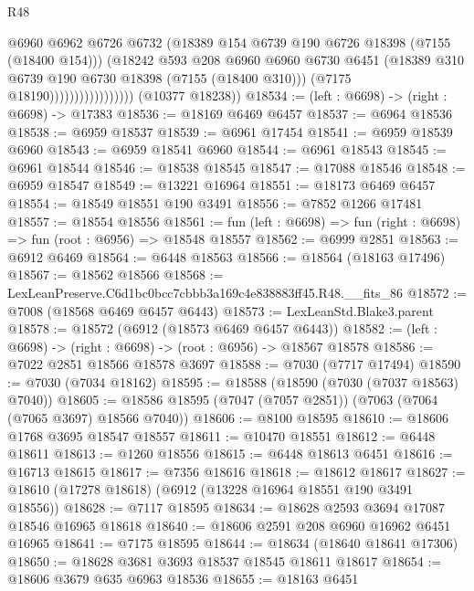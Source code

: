\begin{lexlean}{R48}
\begin{coremodule}
                                    @6960
                                    @6962
                                    @6726
                                    @6732
                                    (@18389 @154 @6739 @190 @6726 @18398 (@7155 (@18400 @154)))
                                    (@18242
                                      @593
                                      @208
                                      @6960
                                      @6960
                                      @6730
                                      @6451
                                      (@18389 @310 @6739 @190 @6730 @18398 (@7155 (@18400 @310)))
                                      (@7175 @18190)))))))))))))))))
      (@10377 @18238))
@18534 := (left : @6698) -> (right : @6698) -> @17383
@18536 := @18169 @6469 @6457
@18537 := @6964 @18536
@18538 := @6959 @18537
@18539 := @6961 @17454
@18541 := @6959 @18539 @6960
@18543 := @6959 @18541 @6960
@18544 := @6961 @18543
@18545 := @6961 @18544
@18546 := @18538 @18545
@18547 := @17088 @18546
@18548 := @6959 @18547
@18549 := @13221 @16964
@18551 := @18173 @6469 @6457
@18554 := @18549 @18551 @190 @3491
@18556 := @7852 @1266 @17481
@18557 := @18554 @18556
@18561 := fun (left : @6698) => fun (right : @6698) => fun (root : @6956) => @18548 @18557
@18562 := @6999 @2851
@18563 := @6912 @6469
@18564 := @6448 @18563
@18566 := @18564 (@18163 @17496)
@18567 := @18562 @18566
@18568 := LexLeanPreserve.C6d1bc0bcc7cbbb3a169c4e838883ff45.R48.__fits_86
@18572 := @7008 (@18568 @6469 @6457 @6443)
@18573 := LexLeanStd.Blake3.parent
@18578 := @18572 (@6912 (@18573 @6469 @6457 @6443))
@18582 := (left : @6698) -> (right : @6698) -> (root : @6956) -> @18567 @18578
@18586 := @7022 @2851 @18566 @18578 @3697
@18588 := @7030 (@7717 @17494)
@18590 := @7030 (@7034 @18162)
@18595 := @18588 (@18590 (@7030 (@7037 @18563) @7040))
@18605 := @18586 @18595 (@7047 (@7057 @2851)) (@7063 (@7064 (@7065 @3697) @18566 @7040))
@18606 := @8100 @18595
@18610 := @18606 @1768 @3695 @18547 @18557
@18611 := @10470 @18551
@18612 := @6448 @18611
@18613 := @1260 @18556
@18615 := @6448 @18613 @6451
@18616 := @16713 @18615
@18617 := @7356 @18616
@18618 := @18612 @18617
@18627 := @18610 (@17278 @18618) (@6912 (@13228 @16964 @18551 @190 @3491 @18556))
@18628 := @7117 @18595
@18634 := @18628 @2593 @3694 @17087 @18546 @16965 @18618
@18640 := @18606 @2591 @208 @6960 @16962 @6451 @16965
@18641 := @7175 @18595
@18644 := @18634 (@18640 @18641 @17306)
@18650 := @18628 @3681 @3693 @18537 @18545 @18611 @18617
@18654 := @18606 @3679 @635 @6963 @18536
@18655 := @18163 @6451

\end{coremodule}
\end{lexlean}

